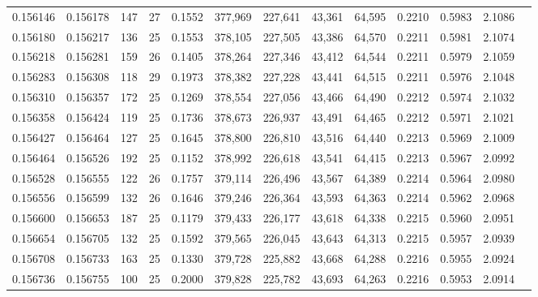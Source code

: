 \begin{tabular}{rrrrrrrrrrrrr}
0.156146 & 0.156178 & 147 &  27 &                                     0.1552 & 377,969 & 227,641 &  43,361 &  64,595 & 0.2210 & 0.5983 & 2.1086 \\
0.156180 & 0.156217 & 136 &  25 &                                     0.1553 & 378,105 & 227,505 &  43,386 &  64,570 & 0.2211 & 0.5981 & 2.1074 \\
0.156218 & 0.156281 & 159 &  26 &                                     0.1405 & 378,264 & 227,346 &  43,412 &  64,544 & 0.2211 & 0.5979 & 2.1059 \\
0.156283 & 0.156308 & 118 &  29 &                                     0.1973 & 378,382 & 227,228 &  43,441 &  64,515 & 0.2211 & 0.5976 & 2.1048 \\
0.156310 & 0.156357 & 172 &  25 &                                     0.1269 & 378,554 & 227,056 &  43,466 &  64,490 & 0.2212 & 0.5974 & 2.1032 \\
0.156358 & 0.156424 & 119 &  25 &                                     0.1736 & 378,673 & 226,937 &  43,491 &  64,465 & 0.2212 & 0.5971 & 2.1021 \\
0.156427 & 0.156464 & 127 &  25 &                                     0.1645 & 378,800 & 226,810 &  43,516 &  64,440 & 0.2213 & 0.5969 & 2.1009 \\
0.156464 & 0.156526 & 192 &  25 &                                     0.1152 & 378,992 & 226,618 &  43,541 &  64,415 & 0.2213 & 0.5967 & 2.0992 \\
0.156528 & 0.156555 & 122 &  26 &                                     0.1757 & 379,114 & 226,496 &  43,567 &  64,389 & 0.2214 & 0.5964 & 2.0980 \\
0.156556 & 0.156599 & 132 &  26 &                                     0.1646 & 379,246 & 226,364 &  43,593 &  64,363 & 0.2214 & 0.5962 & 2.0968 \\
0.156600 & 0.156653 & 187 &  25 &                                     0.1179 & 379,433 & 226,177 &  43,618 &  64,338 & 0.2215 & 0.5960 & 2.0951 \\
0.156654 & 0.156705 & 132 &  25 &                                     0.1592 & 379,565 & 226,045 &  43,643 &  64,313 & 0.2215 & 0.5957 & 2.0939 \\
0.156708 & 0.156733 & 163 &  25 &                                     0.1330 & 379,728 & 225,882 &  43,668 &  64,288 & 0.2216 & 0.5955 & 2.0924 \\
0.156736 & 0.156755 & 100 &  25 &                                     0.2000 & 379,828 & 225,782 &  43,693 &  64,263 & 0.2216 & 0.5953 & 2.0914 \\

\end{tabular}
